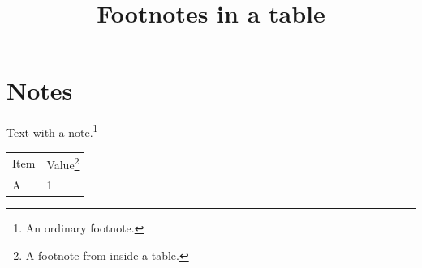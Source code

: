 \documentclass{article}
\title{Footnotes in a table}
\begin{document}
\maketitle
\section{Notes}
Text with a note.\footnote{An ordinary footnote.}
\begin{savenotes}
\begin{tabular}{ll}
  Item & Value\footnote{A footnote from inside a table.} \\
  A & 1
\end{tabular}
\end{savenotes}
\end{document}
